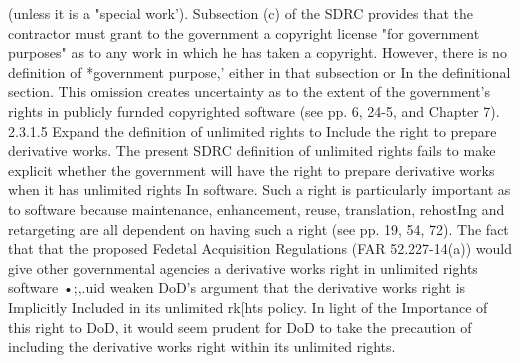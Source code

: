\documentclass[12pt]{article}
\begin{document}
(unless it is a "special work'). Subsection (c) of the SDRC provides that the contractor must grant to
the government a copyright license "for government purposes" as to any work in which he has taken
a copyright. However, there is no definition of *government purpose,' either in that subsection or In
the definitional section. This omission creates uncertainty as to the extent of the government's rights
in publicly furnded copyrighted software (see pp. 6, 24-5, and Chapter 7).
2.3.1.5 Expand the definition of unlimited rights to Include the right to prepare derivative
works.
The present SDRC definition of unlimited rights fails to make explicit whether the government will
have the right to prepare derivative works when it has unlimited rights In software. Such a right is
particularly important as to software because maintenance, enhancement, reuse, translation, rehostIng and retargeting are all dependent on having such a right (see pp. 19, 54, 72). The fact that that
the proposed Fedetal Acquisition Regulations (FAR 52.227-14(a)) would give other governmental
agencies a derivative works right in unlimited rights software •;,.uid weaken DoD's argument that the
derivative works right is Implicitly Included in its unlimited rk[hts policy. In light of the Importance of
this right to DoD, it would seem prudent for DoD to take the precaution of including the derivative
works right within its unlimited rights.
\end{document}
